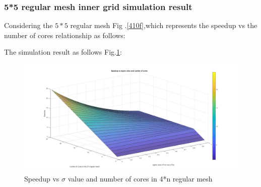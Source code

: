 \subsubsection{5*5 regular mesh inner grid simulation result}

Considering the $5*5$ regular mesh Fig .\ref{410f},which represents the speedup vs the number of cores relationship as follows:

The simulation result as follows Fig.\ref{inner4n}:

\begin{figure}[h]
\centering\includegraphics[width=0.85\linewidth]{figure/inner4n}
\caption{Speedup vs $\sigma$ value and number of cores in 4*n regular mesh}
\label{inner4n}
\end{figure}



